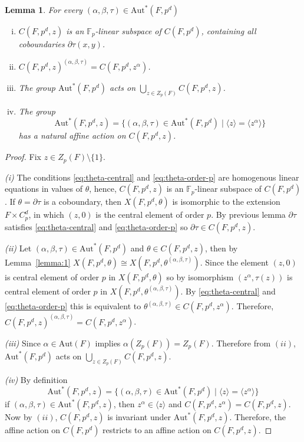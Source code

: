 \documentclass[12pt,a4paper]{amsart}
\newtheorem{lemma}[theorem]{Lemma}
\theoremstyle{definition}
\begin{document}
\begin{lemma} \label{lem:restricted-ext}
For every $(\alpha,\beta,\tau)\in\mathrm{Aut}^{\!*}(F,p^{d})$
\begin{enumerate}[(i)]
 \item $C(F,p^{d},z)$ is an $\mathbb{F}_{p}$-linear subspace of $C(F,p^{d})$, containing all coboundaries $\partial \tau(x,y)$.
 \item $C(F,p^{d},z)^{(\alpha,\beta,\tau)}=C(F,p^{d},z^{\alpha})$.
 \item The group $\mathrm{Aut}^{\!*}(F,p^{d})$ acts on $\bigcup\limits_{z \in Z_{p}(F)} C(F, p^{d}, z)$.
 \item The group
 \[\mathrm{Aut}^{\!*}(F,p^d,z)=\{(\alpha,\beta,\tau) \in \mathrm{Aut}^{\!*}(F,p^d) \mid \langle z \rangle=\langle z^\alpha \rangle\}\]
 has a natural affine action on $C(F,p^d,z)$. 
\end{enumerate}
\end{lemma}
\begin{proof}
Fix $z \in Z_p{(F)}\setminus \{1\}$.

\noindent\textit{(i)}
The conditions \eqref{eq:theta-central} and \eqref{eq:theta-order-p} are homogenous linear equations in values of $\theta$, hence, $C(F,p^d,z)$ is an $\mathbb{F}_p$-linear subspace of $C(F,p^d)$. If $\theta=\partial\tau$ is a coboundary, then $X(F,p^d,\theta)$ is isomorphic to the extension $F\times C_p^d$, in which $(z,0)$ is the central element of order $p$. By previous lemma $\partial\tau$ satisfies \eqref{eq:theta-central} and \eqref{eq:theta-order-p} so $\partial\tau \in C(F,p^d,z)$.

\noindent\textit{(ii)}
Let $(\alpha,\beta,\tau) \in \mathrm{Aut}^{\!*}(F,p^d)$ and $\theta \in C(F,p^d,z)$, then by Lemma~\ref{lemma:1} $X(F,p^d,\theta) \cong X(F,p^d,\theta^{(\alpha,\beta,\tau)})$. Since the element $(z,0)$ is central element of order $p$ in $X(F,p^d,\theta)$ so by isomorphism $(z^{\alpha},\tau(z))$ is central element of order $p$ in $X(F,p^d,\theta^{(\alpha,\beta,\tau)})$. By \eqref{eq:theta-central} and \eqref{eq:theta-order-p} this is equivalent to $\theta^{(\alpha,\beta,\tau)} \in C(F,p^d,z^\alpha)$. Therefore, $C(F,p^d,z)^{(\alpha,\beta,\tau)}=C(F,p^d,z^\alpha)$.

\noindent\textit{(iii)}
Since $\alpha \in \mathrm{Aut}(F)$ implies $\alpha(Z_p(F))=Z_p(F)$. Therefore from $(ii)$, $\mathrm{Aut}^{\!*}(F,p^d)$  acts on $\bigcup\limits_{z \in Z_{p}(F)} C(F, p^{d}, z)$.

\noindent\textit{(iv)}
By definition
\[\mathrm{Aut}^{\!*}(F,p^d,z)=\{(\alpha,\beta,\tau) \in \mathrm{Aut}^{\!*}(F,p^d) \mid \langle z \rangle=\langle z^\alpha \rangle\}\]
if $(\alpha,\beta,\tau) \in \mathrm{Aut}^{\!*}(F,p^d,z)$, then $z^\alpha \in \langle z \rangle$ and $C(F,p^d,z^\alpha)=C(F,p^d,z)$. 
Now by $(ii)$, $C(F,p^d,z)$ is invariant under $\mathrm{Aut}^{\!*}(F,p^d,z)$. Therefore, the affine action on $C(F,p^d)$ restricts to an affine action on $C(F,p^d,z)$.
\end{proof}
\end{document}

